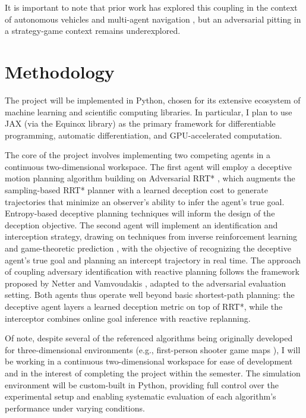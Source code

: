 \documentclass[letterpaper, 10pt, conference]{ieeeconf}
\begin{document}
It is important to note that prior work has explored this coupling in the context of autonomous vehicles \cite{espinoza2022deep} and multi-agent navigation \cite{netter2024motion, lecleach2021lucidgames}, but an adversarial pitting in a strategy-game context remains underexplored.

\section{Methodology} \label{sec:methodology}

The project will be implemented in Python, chosen for its extensive ecosystem of machine learning and scientific computing libraries. In particular, I plan to use JAX (via the Equinox library) as the primary framework for differentiable programming, automatic differentiation, and GPU-accelerated computation.

The core of the project involves implementing two competing agents in a continuous two-dimensional workspace. The first agent will employ a deceptive motion planning algorithm building on Adversarial RRT* \cite{nichols2022adversarial}, which augments the sampling-based RRT* planner with a learned deception cost to generate trajectories that minimize an observer's ability to infer the agent's true goal. Entropy-based deceptive planning techniques \cite{xu2020single, xu2019goal} will inform the design of the deception objective. The second agent will implement an identification and interception strategy, drawing on techniques from inverse reinforcement learning and game-theoretic prediction \cite{zeng2023recognition, tastan2012learning, lecleach2021lucidgames}, with the objective of recognizing the deceptive agent's true goal and planning an intercept trajectory in real time. The approach of coupling adversary identification with reactive planning follows the framework proposed by Netter and Vamvoudakis \cite{netter2024motion}, adapted to the adversarial evaluation setting. Both agents thus operate well beyond basic shortest-path planning: the deceptive agent layers a learned deception metric on top of RRT*, while the interceptor combines online goal inference with reactive replanning.

Of note, despite several of the referenced algorithms being originally developed for three-dimensional environments (e.g., first-person shooter game maps \cite{tastan2012learning}), I will be working in a continuous two-dimensional workspace for ease of development and in the interest of completing the project within the semester. The simulation environment will be custom-built in Python, providing full control over the experimental setup and enabling systematic evaluation of each algorithm's performance under varying conditions.
\end{document}
